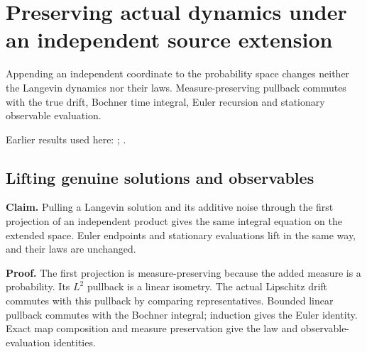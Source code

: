 \documentclass[11pt,a4paper]{report}
\begin{document}
\section{\texorpdfstring{Preserving actual dynamics under an independent source extension}{Preserving actual dynamics under an independent source extension}}
\label{proof-module-WassersteinMixing-SemigroupLift-lean}


Appending an independent coordinate to the probability space changes neither the Langevin dynamics nor their laws. Measure-preserving pullback commutes with the true drift, Bochner time integral, Euler recursion and stationary observable evaluation.



Earlier results used here: \cite[Section~3.14]{LangevinLean2026Kinetic}; \cite[Section~3.16]{LangevinLean2026ULASC}.
\subsection{\texorpdfstring{Lifting genuine solutions and observables}{Lifting genuine solutions and observables}}
\label{report-step-WassersteinMixing-SemigroupLift-lean-1}


\textbf{Claim.} Pulling a Langevin solution and its additive noise through the first projection of an independent product gives the same integral equation on the extended space. Euler endpoints and stationary evaluations lift in the same way, and their laws are unchanged.



\textbf{Proof.} The first projection is measure-preserving because the added measure is a probability. Its \(L^2\) pullback is a linear isometry. The actual Lipschitz drift commutes with this pullback by comparing representatives. Bounded linear pullback commutes with the Bochner integral; induction gives the Euler identity. Exact map composition and measure preservation give the law and observable-evaluation identities.
\end{document}
